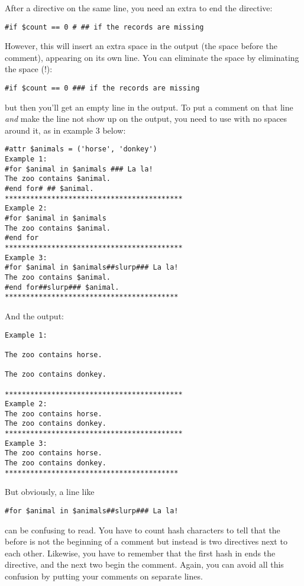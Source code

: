 After a directive on the same line, you need an extra \code{\#} to end the
directive:
\begin{verbatim}
#if $count == 0 # ## if the records are missing
\end{verbatim}

However, this will insert an extra space in the output (the space before the
comment), appearing on its own line.  You can eliminate the space by eliminating
the space (!): 
\begin{verbatim}
#if $count == 0 ### if the records are missing
\end{verbatim}
but then you'll get an empty line in the output.  To put a comment on that
line {\em and} make the line not show up on the output, you need to use
 with no spaces around it, as in example 3 below:

\begin{verbatim}
#attr $animals = ('horse', 'donkey')
Example 1:
#for $animal in $animals ### La la!
The zoo contains $animal.
#end for# ## $animal.
******************************************
Example 2:
#for $animal in $animals
The zoo contains $animal.
#end for
******************************************
Example 3:
#for $animal in $animals##slurp### La la!
The zoo contains $animal.
#end for##slurp### $animal.
*****************************************
\end{verbatim}

And the output:

\begin{verbatim}
Example 1:

The zoo contains horse.

The zoo contains donkey.
 
******************************************
Example 2:
The zoo contains horse.
The zoo contains donkey.
******************************************
Example 3:
The zoo contains horse.
The zoo contains donkey.
*****************************************

\end{verbatim}

But obviously, a line like
\begin{verbatim}
#for $animal in $animals##slurp### La la!
\end{verbatim}
can be confusing to read.  You have to count hash characters to tell that the
\code{\#\#} before  is not the beginning of a comment but instead
is two directives next to each other.  Likewise, you have to remember
that the first hash in \code{\#\#\#} ends the  directive, and the
next two begin the comment.  Again, you can avoid all this confusion by putting
your comments on separate lines.

